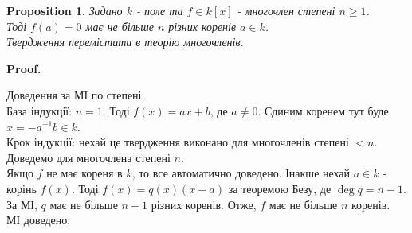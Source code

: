 \documentclass[a4paper, 10pt]{article}
\makeatletter
\theoremstyle{theoremdd}
\theoremstyle{theoremdd}
\theoremstyle{theoremdd}
\theoremstyle{theoremdd}
\theoremstyle{theoremdd}
\newtheorem{proposition}[theorem]{Proposition}
\theoremstyle{theoremdd}
\theoremstyle{theoremdd}
\theoremstyle{theoremdd}
\renewenvironment{proof}[1][Proof.\\]{\par
\pushQED{\hfill \qed}%
\normalfont \topsep6\p@\@plus6\p@\relax
\trivlist
\item\relax
{\bfseries
#1\@addpunct{.}}\hspace\labelsep\ignorespaces
}{%
\popQED\endtrivlist\@endpefalse
}
\makeatother
\begin{document}
\begin{proposition}
Задано $k$ - поле та $f \in k[x]$ - многочлен степені $n \geq 1$.\\
Тоді $f(a) = 0$ має не більше $n$ різних коренів $a \in k$.\\
\textit{Твердження перемістити в теорію многочленів.}
\end{proposition}

\begin{proof}
Доведення за МІ по степені.\\
База індукції: $n = 1$. Тоді $f(x) = ax+b$, де $a \neq 0$. Єдиним коренем тут буде $x = -a^{-1}b \in k$.\\
Крок індукції: нехай це твердження виконано для многочленів степені $< n$. Доведемо для многочлена степені $n$.\\
Якщо $f$ не має кореня в $k$, то все автоматично доведено. Інакше нехай $a \in k$ - корінь $f(x)$. Тоді $f(x) = q(x)(x-a)$ за теоремою Безу, де $\deg q = n-1$. За МІ, $q$ має не більше $n-1$ різних коренів. Отже, $f$ має не більше $n$ коренів.\\
МІ доведено.
\end{proof}
\end{document}
